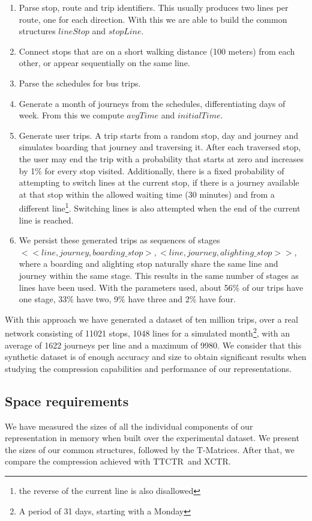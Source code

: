 \documentclass[runningheads]{llncs}
\newcommand{\acumm}{T-Matrices} %
\newcommand{\ctr}{XCTR}
\newcommand{\ttctr}{TTCTR}
\begin{document}
\begin{enumerate}
    \item Parse stop, route and trip identifiers. This usually produces two lines per route, one for each direction. With this we are able to build the common structures $lineStop$ and $stopLine$.
    \item Connect stops that are on a short walking distance (100 meters) from each other, or appear sequentially on the same line.
    \item Parse the schedules for bus trips.
    \item Generate a month of journeys from the schedules, differentiating days of week. From this we compute $avgTime$ and $initialTime$.
    \item Generate user trips. A trip starts from a random stop, day and journey and simulates boarding that journey and traversing it. After each traversed stop, the user may end the trip with a probability that starts at zero and increases by 1\% for every stop visited. Additionally, there is a fixed probability of attempting to switch lines at the current stop, if there is a journey available at that stop within the allowed waiting time (30 minutes) and from a different line\footnote{the reverse of the current line is also disallowed}. Switching lines is also attempted when the end of the current line is reached.
    \item We persist these generated trips as sequences of stages \\ $<<line,journey,boarding\_stop>, <line,journey,alighting\_stop>>$,\\ where a boarding and alighting stop naturally share the same line and journey within the same stage. This results in the same number of stages as lines have been used. With the parameters used, about 56\% of our trips have one stage, 33\% have two, 9\% have three and 2\% have four.
\end{enumerate}

With this approach we have generated a dataset of ten million trips, over a real network consisting of 11021 stops, 1048 lines for a simulated month\footnote{A period of 31 days, starting with a Monday}, with an average of 1622 journeys per line and a maximum of 9980. We consider that this synthetic dataset is of enough accuracy and size to obtain significant results when studying the compression capabilities and performance of our representations.

\subsection{Space requirements}
\label{sec:space}
We have measured the sizes of all the individual components of our representation in memory when built over the experimental dataset. We present the sizes of our common structures, followed by the \acumm\marginpar{Missing \acumm~sizes!}. After that, we compare the compression achieved with \ttctr~and \ctr.
\end{document}

